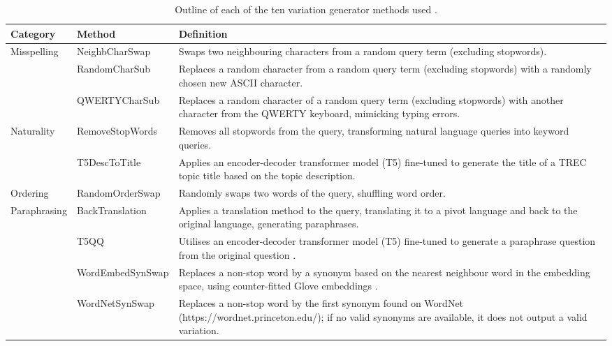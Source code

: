 \begin{table}
\caption{Outline of each of the ten variation generator methods used \cite{penha2022}.}
\label{tab:var-gens}
\begin{tabularx}{\columnwidth}{l|l|X}
\textbf{Category} &
  \textbf{Method} &
  \textbf{Definition} \\ \hline
\multirow{3}{*}{Misspelling} &
  NeighbCharSwap &
  Swaps two neighbouring characters from a random query term (excluding stopwords). \\ \cline{2-3} 
 &
  RandomCharSub &
  Replaces a random character from a random query term (excluding stopwords) with a randomly chosen new ASCII character. \\ \cline{2-3} 
 &
  QWERTYCharSub &
  Replaces a random character of a random query term (excluding stopwords) with another character from the QWERTY keyboard, mimicking typing errors. \\ \hline
\multirow{2}{*}{Naturality} &
  RemoveStopWords &
  Removes all stopwords from the query, transforming natural language queries into keyword queries. \\ \cline{2-3} 
 &
  T5DescToTitle &
  Applies an encoder-decoder transformer model (T5) fine-tuned to generate the title of a TREC topic title based on the topic description. \\ \hline
Ordering &
  RandomOrderSwap &
  Randomly swaps two words of the query, shuffling word order. \\ \hline
\multirow{4}{*}{Paraphrasing} &
  BackTranslation &
  Applies a translation method to the query, translating it to a pivot language and back to the original language, generating paraphrases. \\ \cline{2-3} 
 &
  T5QQ &
  Utilises an encoder-decoder transformer model (T5) fine-tuned to generate a paraphrase question from the original question \cite{desctitle}. \\ \cline{2-3} 
 &
  WordEmbedSynSwap &
  Replaces a non-stop word by a synonym based on the nearest neighbour word in the embedding space, using counter-fitted Glove embeddings \cite{glovefit}. \\ \cline{2-3} 
 &
  WordNetSynSwap &
  Replaces a non-stop word by the first synonym found on WordNet (https://wordnet.princeton.edu/); if no valid synonyms are available, it does not output a valid variation. \\ \hline
\end{tabularx}
\end{table}